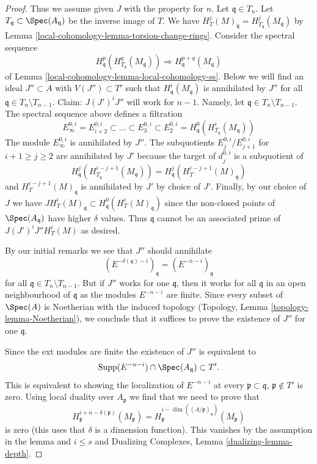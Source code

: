 \begin{proof}
\medskip\noindent
Thus we assume given $J$ with the property for $n$.
Let $\mathfrak q \in T_n$. Let $T_\mathfrak q \subset \Spec(A_\mathfrak q)$
be the inverse image of $T$. We have
$H^j_T(M)_\mathfrak q = H^j_{T_\mathfrak q}(M_\mathfrak q)$
by Lemma \ref{local-cohomology-lemma-torsion-change-rings}.
Consider the spectral sequence
$$
H_\mathfrak q^p(H^q_{T_\mathfrak q}(M_\mathfrak q))
\Rightarrow
H^{p + q}_\mathfrak q(M_\mathfrak q)
$$
of Lemma \ref{local-cohomology-lemma-local-cohomology-ss}.
Below we will find an ideal $J'' \subset A$ with $V(J'') \subset T'$
such that $H^i_\mathfrak q(M_\mathfrak q)$ is annihilated by $J''$ for all
$\mathfrak q \in T_n \setminus T_{n - 1}$.
Claim: $J (J')^i J''$ will work for $n - 1$.
Namely, let $\mathfrak q \in T_n \setminus T_{n - 1}$.
The spectral sequence above defines a filtration
$$
E_\infty^{0, i} = E_{i + 2}^{0, i} \subset \ldots \subset E_3^{0, i} \subset
E_2^{0, i} = H^0_\mathfrak q(H^i_{T_\mathfrak q}(M_\mathfrak q))
$$
The module $E_\infty^{0, i}$ is annihilated by $J''$.
The subquotients $E_j^{0, i}/E_{j + 1}^{0, i}$ for $i + 1 \geq j \geq 2$
are annihilated by $J'$ because the target of $d_j^{0, i}$
is a subquotient of
$$
H^j_\mathfrak q(H^{i - j + 1}_{T_\mathfrak q}(M_\mathfrak q)) =
H^j_\mathfrak q(H^{i - j + 1}_T(M)_\mathfrak q)
$$
and $H^{i - j + 1}_T(M)_\mathfrak q$ is annihilated by $J'$ by choice of $J'$.
Finally, by our choice of $J$ we have
$J H^i_T(M)_\mathfrak q \subset H^0_\mathfrak q(H^i_T(M)_\mathfrak q)$
since the non-closed points of $\Spec(A_\mathfrak q)$ have higher
$\delta$ values. Thus $\mathfrak q$ cannot be an associated prime of
$J(J')^iJ'' H^i_T(M)$ as desired.

\medskip\noindent
By our initial remarks we see that $J''$ should annihilate
$$
(E^{-\delta(\mathfrak q) - i})_\mathfrak q =
(E^{-n - i})_\mathfrak q
$$
for all $\mathfrak q \in T_n \setminus T_{n - 1}$.
But if $J''$ works for one $\mathfrak q$, then it works for all
$\mathfrak q$ in an open neighbourhood of $\mathfrak q$
as the modules $E^{-n - i}$ are finite.
Since every subset of $\Spec(A)$ is Noetherian with the induced
topology (Topology, Lemma \ref{topology-lemma-Noetherian}),
we conclude that it suffices
to prove the existence of $J''$ for one $\mathfrak q$.

\medskip\noindent
Since the ext modules are finite the existence of $J''$ is
equivalent to
$$
\text{Supp}(E^{-n - i}) \cap \Spec(A_\mathfrak q) \subset T'.
$$
This is equivalent to showing the localization of $E^{-n - i}$ at every
$\mathfrak p \subset \mathfrak q$, $\mathfrak p \not \in T'$
is zero. Using local duality over $A_\mathfrak p$ we find that we need
to prove that
$$
H^{i + n - \delta(\mathfrak p)}_\mathfrak p(M_\mathfrak p) =
H^{i - \dim((A/\mathfrak p)_\mathfrak q)}_\mathfrak p(M_\mathfrak p)
$$
is zero (this uses that $\delta$ is a dimension function).
This vanishes by the assumption in the lemma and $i \leq s$ and
Dualizing Complexes, Lemma \ref{dualizing-lemma-depth}.


\end{proof}
